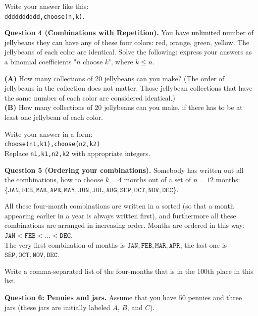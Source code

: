 \documentclass[jou]{apa6}
\begin{document}
Write your answer like this:\\ {\tt dddddddddd,choose(n,k)}.


\vspace{6pt}
{\bf Question 4 (Combinations with Repetition).} You have unlimited number of jellybeans \textendash{}
they can have any of these four colors: red, orange, green, yellow. The jellybeans of each
color are identical. Solve the following: express your answers as a binomial coefficients "$n$ choose $k$", 
where $k \leq n$.

{\bf (A)}  How many collections of $20$ jellybeans can you make? (The order of jellybeans in the collection 
does not matter. Those jellybean collections that have the same number of each color are considered identical.)\\
{\bf (B)} How many collections of $20$ jellybeans can you make, if there has to be at least one jellybean 
of each color. 

Write your answer in a form:\\ {\tt choose(n1,k1),choose(n2,k2)}\\
Replace {\tt n1,k1,n2,k2} with appropriate integers.


\vspace{6pt}
{\bf Question 5 (Ordering your combinations).} 
Somebody has written out all the combinations, how to choose $k=4$ months out of a set of 
$n=12$ months:\\
{\small
$\{ \mathtt{JAN},\mathtt{FEB},\mathtt{MAR},\mathtt{APR},\mathtt{MAY},\mathtt{JUN},
\mathtt{JUL},\mathtt{AUG},\mathtt{SEP},\mathtt{OCT},\mathtt{NOV},\mathtt{DEC} \}.$
}

All these four-month combinations are written in a sorted (so that a month appearing earlier in a year is always
written first), and furthermore \textendash{} all these combinations are arranged in increasing order. 
Months are ordered in this way: $\mathtt{JAN} < \mathtt{FEB} < \ldots < \mathtt{DEC}$.\\
The very first combination of months is $\mathtt{JAN},\mathtt{FEB},\mathtt{MAR},\mathtt{APR}$, 
the last one is $\mathtt{SEP},\mathtt{OCT},\mathtt{NOV},\mathtt{DEC}$. 

Write a comma-separated list of the four-months that is in the $100$th place in this list. 


\vspace{6pt}
{\bf Question 6: Pennies and jars.} 
Assume that you have $50$ pennies and three jars (these jars are initially labeled $A$, $B$, and $C$). 
\end{document}
